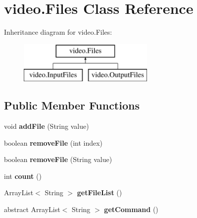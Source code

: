 \hypertarget{classvideo_1_1_files}{
\section{video.Files Class Reference}
\label{classvideo_1_1_files}
}
Inheritance diagram for video.Files:\begin{figure}[H]
\begin{center}
\leavevmode
\includegraphics[height=2.000000cm]{classvideo_1_1_files}
\end{center}
\end{figure}
\subsection*{Public Member Functions}
\begin{DoxyCompactItemize}
\item 
\hypertarget{classvideo_1_1_files_ab78f98336e4a07f7e81f47a2b454b987}{
void {\bfseries addFile} (String value)}
\label{classvideo_1_1_files_ab78f98336e4a07f7e81f47a2b454b987}

\item 
\hypertarget{classvideo_1_1_files_ad0263251ba4d69044fd1f8dd7913ffc1}{
boolean {\bfseries removeFile} (int index)}
\label{classvideo_1_1_files_ad0263251ba4d69044fd1f8dd7913ffc1}

\item 
\hypertarget{classvideo_1_1_files_a9eba9c6a3a84fcc69b9fc46ed3a47502}{
boolean {\bfseries removeFile} (String value)}
\label{classvideo_1_1_files_a9eba9c6a3a84fcc69b9fc46ed3a47502}

\item 
\hypertarget{classvideo_1_1_files_ac712ec5544f4d54819e3c7bcb53dae8c}{
int {\bfseries count} ()}
\label{classvideo_1_1_files_ac712ec5544f4d54819e3c7bcb53dae8c}

\item 
\hypertarget{classvideo_1_1_files_a9f0bfb46b7eb610e5a874789f3cac1aa}{
ArrayList$<$ String $>$ {\bfseries getFileList} ()}
\label{classvideo_1_1_files_a9f0bfb46b7eb610e5a874789f3cac1aa}

\item 
\hypertarget{classvideo_1_1_files_a5ae62f98b97955cbeb16fa2f67e30f02}{
abstract ArrayList$<$ String $>$ {\bfseries getCommand} ()}
\label{classvideo_1_1_files_a5ae62f98b97955cbeb16fa2f67e30f02}

\end{DoxyCompactItemize}
